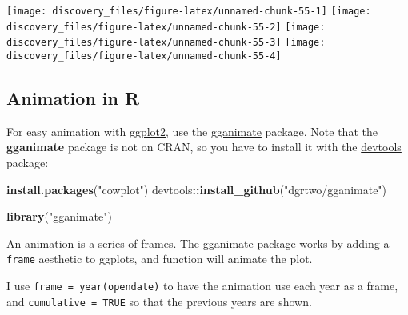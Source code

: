 \documentclass[]{book}
\newenvironment{Shaded}{\begin{snugshade}}{\end{snugshade}}
\newcommand{\KeywordTok}[1]{\textcolor[rgb]{0.13,0.29,0.53}{\textbf{#1}}}
\newcommand{\StringTok}[1]{\textcolor[rgb]{0.31,0.60,0.02}{#1}}
\newcommand{\OperatorTok}[1]{\textcolor[rgb]{0.81,0.36,0.00}{\textbf{#1}}}
\newcommand{\NormalTok}[1]{#1}
\theoremstyle{definition}
\theoremstyle{definition}
\theoremstyle{definition}
\theoremstyle{remark}
\begin{document}
\begin{center}\texttt{[image: discovery\_files/figure-latex/unnamed-chunk-55-1]} \texttt{[image: discovery\_files/figure-latex/unnamed-chunk-55-2]} \texttt{[image: discovery\_files/figure-latex/unnamed-chunk-55-3]} \texttt{[image: discovery\_files/figure-latex/unnamed-chunk-55-4]} \end{center}

\subsection{Animation in R}\label{animation-in-r}

For easy animation with
\href{https://cran.r-project.org/package=ggplot2}{ggplot2}, use the
\href{https://github.com/dgrtwo/gganimate}{gganimate} package. Note that
the \textbf{gganimate} package is not on CRAN, so you have to install it
with the \href{https://cran.r-project.org/package=devtools}{devtools}
package:

\begin{Shaded}
\begin{Highlighting}[]
\KeywordTok{install.packages}\NormalTok{(}\StringTok{"cowplot"}\NormalTok{)}
\NormalTok{devtools}\OperatorTok{::}\KeywordTok{install_github}\NormalTok{(}\StringTok{"dgrtwo/gganimate"}\NormalTok{)}
\end{Highlighting}
\end{Shaded}

\begin{Shaded}
\begin{Highlighting}[]
\KeywordTok{library}\NormalTok{(}\StringTok{"gganimate"}\NormalTok{)}
\end{Highlighting}
\end{Shaded}

An animation is a series of frames. The
\href{https://cran.r-project.org/package=gganimate}{gganimate} package
works by adding a \texttt{frame} aesthetic to ggplots, and function will
animate the plot.

I use \texttt{frame\ =\ year(opendate)} to have the animation use each
year as a frame, and \texttt{cumulative\ =\ TRUE} so that the previous
years are shown.
\end{document}

